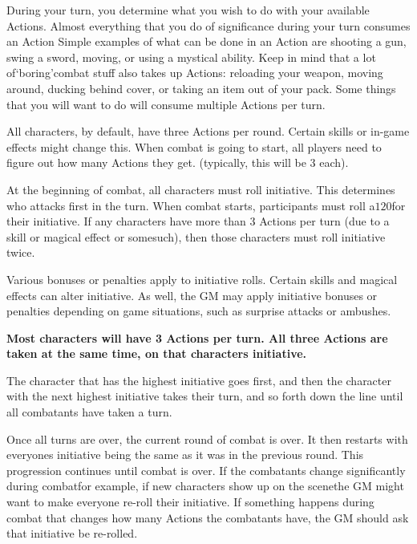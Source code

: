 \documentclass[twoside]{book}
\begin{document}
    {  
    During your turn, you determine what you wish to do with your available Actions. Almost everything that you do of significance during your turn consumes an Action Simple examples of what can be done in an Action are shooting a gun, swing a sword, moving, or using a mystical ability. Keep in mind that a lot of`boring'combat stuff also takes up Actions: reloading your weapon, moving around, ducking behind cover, or taking an item out of your pack. Some things that you will want to do will consume multiple Actions per turn.
    }
  
    {  
    All characters, by default, have three Actions per round. Certain skills or in-game effects might change this. When combat is going to start, all players need to figure out how many Actions they get. (typically, this will be 3 each).
    }
  
    {  
    At the beginning of combat, all characters must roll initiative. This determines who attacks first in the turn. When combat starts, participants must roll a\ensuremath{1}\ensuremath{20}\ensuremath{}for their initiative. If any characters have more than 3 Actions per turn (due to a skill or magical effect or somesuch), then those characters must roll initiative twice.
    }
  
    {  
    Various bonuses or penalties apply to initiative rolls. Certain skills and magical effects can alter initiative. As well, the GM may apply initiative bonuses or penalties depending on game situations, such as surprise attacks or ambushes.
    }
  

 \textbf{Most characters will have 3 Actions per turn. All three Actions are taken at the same time, on that characters initiative.}


  

  

  
    {  
    The character that has the highest initiative goes first, and then the character with the next highest initiative takes their turn, and so forth down the line until all combatants have taken a turn.
    }
  
    {  
    Once all turns are over, the current round of combat is over. It then restarts with everyones initiative being the same as it was in the previous round. This progression continues until combat is over. If the combatants change significantly during combatfor example, if new characters show up on the scenethe GM might want to make everyone re-roll their initiative. If something happens during combat that changes how many Actions the combatants have, the GM should ask that initiative be re-rolled.
    }
  
\end{document}
